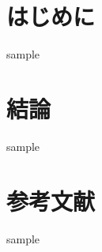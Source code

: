 \documentclass[a4j, 11pt, uplatex]{jsarticle}
\begin{document}
\maketoc

\section{はじめに}
sample

\section{結論}
sample

\section*{参考文献}
sample
\end{document}
